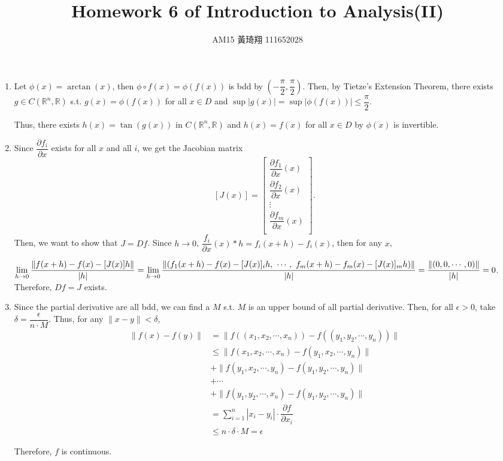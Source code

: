 \documentclass[12pt]{article}
\title{Homework 6 of Introduction to Analysis(II)}
\author{AM15 黃琦翔 111652028}
\begin{document}
\maketitle
\begin{enumerate}
    \item Let $\phi(x) = \arctan(x)$, then $\phi \circ f(x) = \phi(f(x))$ is bdd by $(-\dfrac{\pi}{2}, \dfrac{\pi}{2})$.
    Then, by Tietze's Extension Theorem, there exists $g \in C(\mathbb{R}^n, \mathbb{R})$ s.t. 
    $g(x) = \phi(f(x))$ for all $x\in D$ and $\sup|g(x)| = \sup |\phi(f(x))|\leq \dfrac{\pi}{2}$.

    Thus, there exists $h(x) = \tan(g(x))$ in $C(\mathbb{R}^n, \mathbb{R})$ and $h(x) = f(x)$ for all $x\in D$ by 
    $\phi(x)$ is invertible.

    \item Since $\dfrac{\partial f_i}{\partial x}$ exists for all $x$ and all $i$, 
    we get the Jacobian matrix $$\left[J(x)\right] = \begin{bmatrix}
        \dfrac{\partial f_1}{\partial x}(x)\\
        \dfrac{\partial f_2}{\partial x}(x)\\
        \vdots\\
        \dfrac{\partial f_m}{\partial x}(x)\\
    \end{bmatrix}.$$
    Then, we want to show that $J = Df$.
    Since $h \to 0$, $\dfrac{f_i}{\partial x}(x)*h = f_i(x+h) - f_i(x)$, then for any $x$, 

    $\displaystyle\lim_{h\to 0} \dfrac{\| f(x+h) - f(x) - [J(x)]h\|}{|h|}= \displaystyle\lim_{h\to 0} \dfrac{\| (f_1(x+h) - f(x) - [J(x)]_i h,\ \cdots,\ f_m(x+h) - f_m(x) - [J(x)]_m h)\|}{|h|}\\
    = \dfrac{\| (0, 0, \cdots, 0)\|}{|h|} = 0$.
    Therefore, $Df = J$ exists.

    \item Since the partial derivative are all bdd, we can find a $M$ s.t. $M$ is an upper bound of all partial derivative.
    Then, for all $\epsilon > 0$, take $\delta = \dfrac{\epsilon}{n \cdot M}$.
    Thus, for any $\|x - y\| < \delta$, \begin{align*}
        \| f(x) - f(y) \| &= \| f((x_1, x_2, \cdots, x_n)) - f((y_1, y_2, \cdots, y_n))\| \\
        &\leq \| f(x_1, x_2, \cdots, x_n) - f(y_1, x_2, \cdots, y_n)\|\\
        &+ \| f(y_1, x_2, \cdots, y_n) - f(y_1, y_2, \cdots, y_n)\|\\
        &+ \cdots\\
        &+ \|f(y_1, y_2, \cdots, x_n) - f(y_1, y_2, \cdots, y_n)\|\\
        &= \sum_{i=1}^{n} |x_i - y_i|\cdot \dfrac{\partial f}{\partial x_i}\\
        &\leq n \cdot \delta \cdot M = \epsilon
    \end{align*}

    Therefore, $f$ is continuous.
\end{enumerate}
\end{document}
